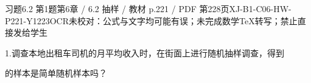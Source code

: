 \begin{bankitem}{习题6.2 第1题}{第6章 / 6.2 抽样 / 教材 p.221 / PDF 第228页}{XJ-B1-C06-HW-P221-Y1223}{OCR未校对：公式与文字均可能有误；未完成数学TeX转写；禁止直接发给学生}
\begin{ocrdraft}
\par
1.调查本地出租车司机的月平均收入时，在街面上进行随机抽样调查，得到
\par
的样本是简单随机样本吗？
\end{ocrdraft}
\end{bankitem}
